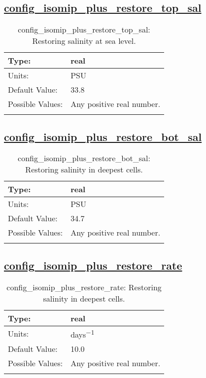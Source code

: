 \subsection[config\_isomip\_plus\_restore\_top\_sal]{\hyperref[sec:nm_tab_isomip_plus]{config\_isomip\_plus\_restore\_top\_sal}}
\label{subsec:nm_sec_config_isomip_plus_restore_top_sal}
\begin{center}
\begin{longtable}{| p{2.0in} || p{4.0in} |}
    \hline
    Type: & real \\
    \hline
    Units: & \si{PSU} \\
    \hline
    Default Value: & 33.8 \\
    \hline
    Possible Values: & Any positive real number. \\
    \hline
    \caption{config\_isomip\_plus\_restore\_top\_sal: Restoring salinity at sea level.}
\end{longtable}
\end{center}
\subsection[config\_isomip\_plus\_restore\_bot\_sal]{\hyperref[sec:nm_tab_isomip_plus]{config\_isomip\_plus\_restore\_bot\_sal}}
\label{subsec:nm_sec_config_isomip_plus_restore_bot_sal}
\begin{center}
\begin{longtable}{| p{2.0in} || p{4.0in} |}
    \hline
    Type: & real \\
    \hline
    Units: & \si{PSU} \\
    \hline
    Default Value: & 34.7 \\
    \hline
    Possible Values: & Any positive real number. \\
    \hline
    \caption{config\_isomip\_plus\_restore\_bot\_sal: Restoring salinity in deepest cells.}
\end{longtable}
\end{center}
\subsection[config\_isomip\_plus\_restore\_rate]{\hyperref[sec:nm_tab_isomip_plus]{config\_isomip\_plus\_restore\_rate}}
\label{subsec:nm_sec_config_isomip_plus_restore_rate}
\begin{center}
\begin{longtable}{| p{2.0in} || p{4.0in} |}
    \hline
    Type: & real \\
    \hline
    Units: & \si{days^{-1}} \\
    \hline
    Default Value: & 10.0 \\
    \hline
    Possible Values: & Any positive real number. \\
    \hline
    \caption{config\_isomip\_plus\_restore\_rate: Restoring salinity in deepest cells.}
\end{longtable}
\end{center}
